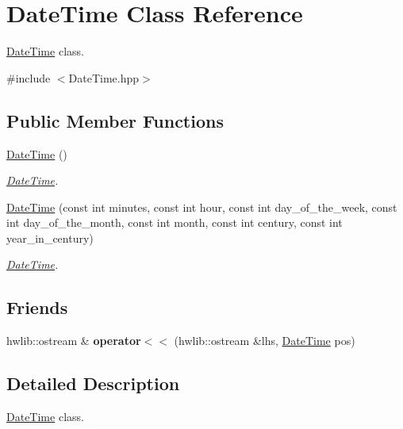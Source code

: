 \hypertarget{class_date_time}{}\section{Date\+Time Class Reference}
\label{class_date_time}


\hyperlink{class_date_time}{Date\+Time} class.  




{\ttfamily \#include $<$Date\+Time.\+hpp$>$}

\subsection*{Public Member Functions}
\begin{DoxyCompactItemize}
\item 
\hyperlink{class_date_time_a3ccfb87f7a2e9683b91964e32d907161}{Date\+Time} ()
\begin{DoxyCompactList}\small\item\em \hyperlink{class_date_time}{Date\+Time}. \end{DoxyCompactList}\item 
\hyperlink{class_date_time_a57a7c544d2a5675efbd7ce543d990f65}{Date\+Time} (const int minutes, const int hour, const int day\+\_\+of\+\_\+the\+\_\+week, const int day\+\_\+of\+\_\+the\+\_\+month, const int month, const int century, const int year\+\_\+in\+\_\+century)
\begin{DoxyCompactList}\small\item\em \hyperlink{class_date_time}{Date\+Time}. \end{DoxyCompactList}\end{DoxyCompactItemize}
\subsection*{Friends}
\begin{DoxyCompactItemize}
\item 
hwlib\+::ostream \& {\bfseries operator$<$$<$} (hwlib\+::ostream \&lhs, \hyperlink{class_date_time}{Date\+Time} pos)\hypertarget{class_date_time_a7bb2ce9194ffc50a69236696ee7d6841}{}\label{class_date_time_a7bb2ce9194ffc50a69236696ee7d6841}

\end{DoxyCompactItemize}


\subsection{Detailed Description}
\hyperlink{class_date_time}{Date\+Time} class. 


